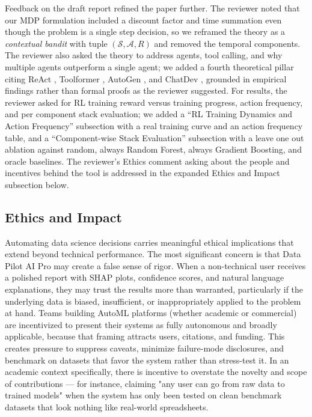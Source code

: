 \documentclass{article}
\begin{document}
Feedback on the draft report refined the paper further. The reviewer noted that our MDP formulation included a discount factor and time summation even though the problem is a single step decision, so we reframed the theory as a \emph{contextual bandit} with tuple $(\mathcal{S}, \mathcal{A}, R)$ and removed the temporal components. The reviewer also asked the theory to address agents, tool calling, and why multiple agents outperform a single agent; we added a fourth theoretical pillar citing ReAct \citep{yao2023react}, Toolformer \citep{schick2023toolformer}, AutoGen \citep{wu2024autogen}, and ChatDev \citep{qian2024chatdev}, grounded in empirical findings rather than formal proofs as the reviewer suggested. For results, the reviewer asked for RL training reward versus training progress, action frequency, and per component stack evaluation; we added a ``RL Training Dynamics and Action Frequency'' subsection with a real training curve and an action frequency table, and a ``Component-wise Stack Evaluation'' subsection with a leave one out ablation against random, always Random Forest, always Gradient Boosting, and oracle baselines. The reviewer's Ethics comment asking about the people and incentives behind the tool is addressed in the expanded Ethics and Impact subsection below.



\subsection{Ethics and Impact}
\label{sec:ethics}

Automating data science decisions carries meaningful ethical implications that extend beyond technical performance. The most significant concern is that Data Pilot AI Pro may create a false sense of rigor. When a non-technical user receives a polished report with SHAP plots, confidence scores, and natural language explanations, they may trust the results more than warranted, particularly if the underlying data is biased, insufficient, or inappropriately applied to the problem at hand. Teams building AutoML platforms (whether academic or commercial) are incentivized to present their systems as fully autonomous and broadly applicable, because that framing attracts users, citations, and funding. This creates pressure to suppress caveats, minimize failure-mode disclosures, and benchmark on datasets that favor the system rather than stress-test it.
In an academic context specifically, there is incentive to overstate the novelty and scope of contributions — for instance, claiming "any user can go from raw data to trained models" when the system has only been tested on clean benchmark datasets that look nothing like real-world spreadsheets.
\end{document}
